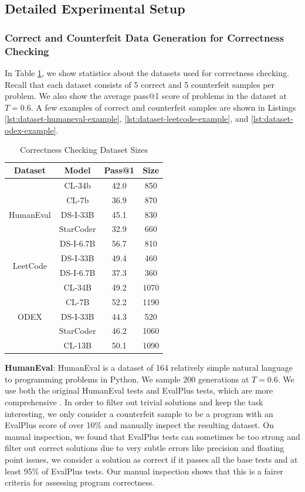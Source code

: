 
\subsection{Detailed Experimental Setup} \label{appendix:detailed-experimental-setup}
\subsubsection{Correct and Counterfeit Data Generation for Correctness Checking}
In Table \ref{tab:dataset-sizes-correctness-checking}, we show statistics about the datasets used for correctness checking. Recall that each dataset consists of 5 correct and 5 counterfeit samples per problem. We also show the average pass@1 score of problems in the dataset at $T=0.6$. A few examples of correct and counterfeit samples are shown in Listings \ref{lst:dataset-humaneval-example}, \ref{lst:dataset-leetcode-example}, and \ref{lst:dataset-odex-example}.

\begin{table}[H]
    \centering
    \caption{Correctness Checking Dataset Sizes}
    \begin{tabular}{cccc}
        \toprule
        \textbf{Dataset} & \textbf{Model} & \textbf{Pass@1} & \textbf{Size} \\
	\midrule
	\multirow{5}{*}{HumanEval}
	& CL-34b & 42.0 & 850 \\
	& CL-7b & 36.9 & 870 \\
	& DS-I-33B & 45.1 & 830 \\
	& StarCoder & 32.9 & 660 \\
	& DS-I-6.7B & 56.7 & 810 \\
        \midrule
	\multirow{2}{*}{LeetCode}
	& DS-I-33B & 49.4 & 460 \\
	& DS-I-6.7B & 37.3 & 360 \\
	\midrule
	\multirow{5}{*}{ODEX}
	& CL-34B & 49.2 & 1070 \\
	& CL-7B & 52.2 & 1190 \\
	& DS-I-33B & 44.3 & 520 \\
	& StarCoder & 46.2 & 1060 \\
	& CL-13B & 50.1 & 1090 \\
    \bottomrule
    \end{tabular}
    \label{tab:dataset-sizes-correctness-checking}
\end{table}

\textbf{HumanEval}: HumanEval \citep{chen2021evaluating} is a dataset of 164 relatively simple natural language to programming problems in Python. We sample $200$ generations at $T=0.6$. We use both the original HumanEval tests and EvalPlus tests, which are more comprehensive \citep{liu2023your}. In order to filter out trivial solutions and keep the task interesting, we only consider a counterfeit sample to be a program with an EvalPlus score of over 10\% and manually inspect the resulting dataset. On manual inspection, we found that EvalPlus tests can sometimes be too strong and filter out correct solutions due to very subtle errors like precision and floating point issues, we consider a solution as correct if it passes all the base tests and at least 95\% of EvalPlus tests. Our manual inspection shows that this is a fairer criteria for assessing program correctness.

